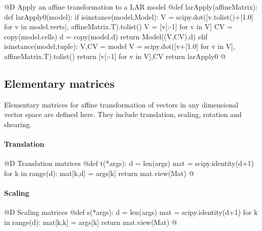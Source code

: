 \documentclass[11pt,oneside]{article}	%
\begin{document}
@D Apply an affine transformation to a LAR model 
@{def larApply(affineMatrix):
	def larApply0(model):
		if isinstance(model,Model):
			V = scipy.dot([v.tolist()+[1.0] for v in model.verts], affineMatrix.T).tolist()
			V = [v[:-1] for v in V]
			CV = copy(model.cells)
			d = copy(model.d)
			return Model((V,CV),d)
		elif isinstance(model,tuple):
			V,CV = model
			V = scipy.dot([v+[1.0] for v in V], affineMatrix.T).tolist()
			return [v[:-1] for v in V],CV
	return larApply0
@}


\subsection{Elementary matrices}
Elementary matrices for affine transformation of vectors in any dimensional vector space are defined here. They include translation, scaling, rotation and shearing. 

\paragraph{Translation}
@D Translation matrices
@{def t(*args): 
	d = len(args)
	mat = scipy.identity(d+1)
	for k in range(d): 
		mat[k,d] = args[k]
	return mat.view(Mat)
@}
\paragraph{Scaling}
@D Scaling matrices
@{def s(*args): 
	d = len(args)
	mat = scipy.identity(d+1)
	for k in range(d): 
		mat[k,k] = args[k]
	return mat.view(Mat)
@}
\end{document}
